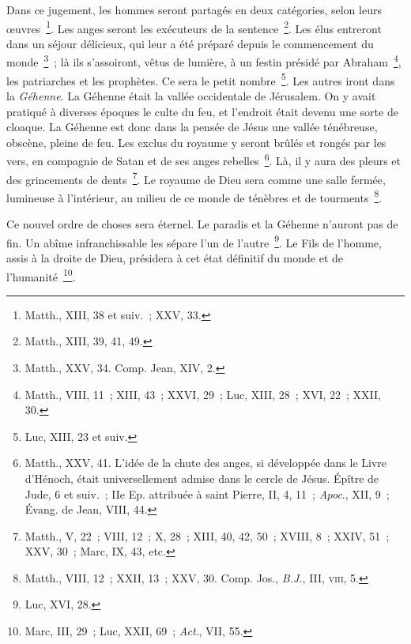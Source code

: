 \documentclass[french,twoside]{book} %
\begin{document}
Dans ce jugement, les hommes seront partagés en deux catégories, selon leurs œuvres \footnote{Matth., XIII, 38 et suiv. ; XXV, 33.}. Les anges seront les exécuteurs de la sentence \footnote{Matth., XIII, 39, 41, 49.}. Les élus entreront dans un séjour délicieux, qui leur a été préparé depuis le commencement du monde \footnote{ Matth., XXV, 34. Comp. Jean, XIV, 2.} ; là ils s’assoiront, vêtus de lumière, à un festin présidé par Abraham \footnote{Matth., VIII, 11 ; XIII, 43 ; XXVI, 29 ; Luc, XIII, 28 ; XVI, 22 ; XXII, 30.}, les patriarches et les prophètes. Ce sera le petit nombre \footnote{Luc, XIII, 23 et suiv.}. Les autres iront dans la {\itshape Géhenne}. La Géhenne était la vallée occidentale de Jérusalem. On y avait pratiqué à diverses époques le culte du feu, et l’endroit était devenu une sorte de cloaque. La Géhenne est donc dans la pensée de Jésus une vallée ténébreuse, obscène, pleine de feu. Les exclus du royaume y seront brûlés et rongés par les vers, en compagnie de Satan et de ses anges rebelles \footnote{ Matth., XXV, 41. L’idée de la chute des anges, si développée dans le Livre d’Hénoch, était universellement admise dans le cercle de Jésus. Épître de Jude, 6 et suiv. ; IIe Ep. attribuée à saint Pierre, II, 4, 11 ; {\itshape Apoc}., XII, 9 ; Évang. de Jean, VIII, 44.}. Là, il y aura des pleurs et des grincements de dents \footnote{Matth., V, 22 ; VIII, 12 ; X, 28 ; XIII, 40, 42, 50 ; XVIII, 8 ; XXIV, 51 ; XXV, 30 ; Marc, IX, 43, etc.}. Le royaume de Dieu sera comme une salle fermée, lumineuse à l’intérieur, au milieu de ce monde de ténèbres et de tourments \footnote{ Matth., VIII, 12 ; XXII, 13 ; XXV, 30. Comp. Jos., {\itshape B.J.}, III, \textsc{viii}, 5.}.\par
Ce nouvel ordre de choses sera éternel. Le paradis et la Géhenne n’auront pas de fin. Un abîme infranchissable les sépare l’un de l’autre \footnote{Luc, XVI, 28.}. Le Fils de l’homme, assis à la droite de Dieu, présidera à cet état définitif du monde et de l’humanité \footnote{ Marc, III, 29 ; Luc, XXII, 69 ; {\itshape Act}., VII, 55.}.\par
\end{document}
